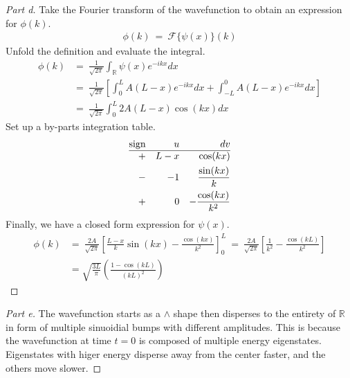 \documentclass{article}
\numberwithin{equation}{section}
\newcommand{\RR}{\mathbb{R}}
\begin{document}
\begin{proof}
    [Part d]
    Take the Fourier transform of the wavefunction to obtain 
    an expression for $\phi(k)$. 
    \begin{align}
        \phi(k) \ = \ \mathcal F\{\psi(x)\}(k)
    \end{align}
    Unfold the definition and evaluate the integral. 
    \begin{align}
        \phi(k) & = \ \frac 1 {\sqrt{2 \pi }} 
        \int_{\RR} \psi(x) e^{-ikx} dx \\ 
        &= \ \frac 1 {\sqrt{2\pi}} 
        \left[
            \int_0^L A(L-x) e^{-ikx} dx 
            + 
            \int_{-L}^0 A(L - x) e^{-ikx}dx
        \right] \\ 
        &= \  \frac 1 {\sqrt{2\pi}} \int_0^L 2A(L - x) \cos(kx)dx 
    \end{align}
    Set up a by-parts integration table. 
    \begin{align*}
        {\rm sign} && u && dv \\ 
        \hline
        + && L - x && \cos(kx) \\ 
        - && -1 && \frac {\sin(kx)} k \\ 
        + && 0 && -\frac{\cos(kx)}{k^2}
    \end{align*}
    Finally, we have a closed form expression for $\psi(x)$. 
    \begin{align}
        \phi(k) & = \ \frac {2A}{\sqrt{2\pi}} \left[
            \frac {L - x} k \sin(kx) - \frac {\cos(kx)}{k^2}
        \right]_0^L \ = \ \frac {2A} {\sqrt{2 \pi }} \left[
            \frac 1 {k^2} - \frac{\cos(kL)} {k^2}
        \right] \\ 
            & = \boxed{
                \sqrt{
                    \frac {3L} {\pi}
                }\left(
                    \frac{1 - \cos(kL)}{(kL)^2}
                \right)
            }
    \end{align}
\end{proof}

\begin{proof}
    [Part e]
    The wavefunction starts as a $\wedge$ shape then disperses 
    to the entirety of $\RR$ in form of multiple sinuoidial bumps 
    with different amplitudes. This is because the wavefunction at 
    time $t = 0$ is composed of multiple energy eigenstates. Eigenstates 
    with higer energy disperse away from the center faster, and the others 
    move slower. 
\end{proof}
\end{document}
